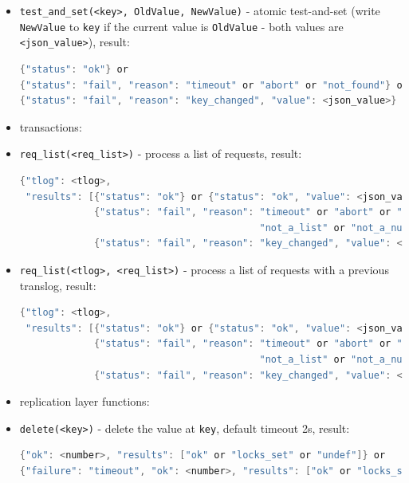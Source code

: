 \documentclass[a4paper]{scrreprt}
\newcommand{\code}[1]{\lstinline[basicstyle=\ttfamily]!#1!}
\begin{document}
\begin{itemize}
  (adds \code{value} to the number at \code{key} - both values must be numbers), result:
\begin{lstlisting}[language=java]
{"status": "ok"} or
{"status": "fail", "reason": "timeout" or "abort" or "not_a_number"}
\end{lstlisting}
  \item \code{test_and_set(<key>, OldValue, NewValue)} - atomic test-and-set
  (write \code{NewValue} to \code{key} if the current value is \code{OldValue}
   - both values are \code{<json_value>}), result:
\begin{lstlisting}[language=java]
{"status": "ok"} or
{"status": "fail", "reason": "timeout" or "abort" or "not_found"} or
{"status": "fail", "reason": "key_changed", "value": <json_value>}
\end{lstlisting}
  \item[] \hspace{-1.7em}transactions:
  \item \code{req_list(<req_list>)} - process a list of requests, result:
\begin{lstlisting}[language=java]
{"tlog": <tlog>,
 "results": [{"status": "ok"} or {"status": "ok", "value": <json_value>} or
             {"status": "fail", "reason": "timeout" or "abort" or "not_found" or
                                          "not_a_list" or "not_a_number"} or
             {"status": "fail", "reason": "key_changed", "value": <json_value>}]}
\end{lstlisting}
  \item \code{req_list(<tlog>, <req_list>)} - process a list of requests with a previous translog, result:
\begin{lstlisting}[language=java]
{"tlog": <tlog>,
 "results": [{"status": "ok"} or {"status": "ok", "value": <json_value>} or
             {"status": "fail", "reason": "timeout" or "abort" or "not_found" or
                                          "not_a_list" or "not_a_number"} or
             {"status": "fail", "reason": "key_changed", "value": <json_value>}]}
\end{lstlisting}
  \item[] \hspace{-1.7em}replication layer functions:
  \item \code{delete(<key>)} - delete the value at \code{key}, default timeout 2s, result:
\begin{lstlisting}[language=java]
{"ok": <number>, "results": ["ok" or "locks_set" or "undef"]} or
{"failure": "timeout", "ok": <number>, "results": ["ok" or "locks_set" or "undef"]}

\end{lstlisting}
\end{itemize}
\end{document}
